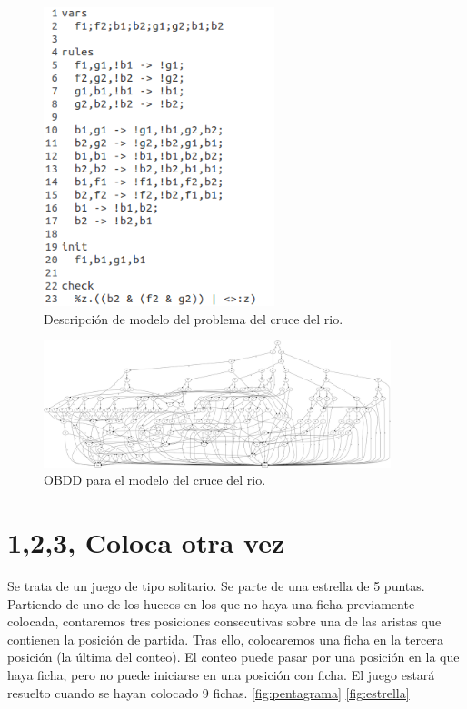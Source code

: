\begin{figure}[H]
  \centering
  \includegraphics[width=0.6\textwidth]{Figures/rivercross.png}
  \caption{Descripción de modelo del problema del cruce del rio.}
  \label{fig:river}
\end{figure}

\begin{figure}[H]
  \centering
  \includegraphics[width=0.9\textwidth]{Figures/riverobdd.png}
  \caption{OBDD para el modelo del cruce del rio.}
  \label{fig:riverobdd}
\end{figure}

\section{1,2,3, Coloca otra vez}

Se trata de un juego de tipo solitario.
Se parte de una estrella de 5 puntas.
Partiendo de uno de los huecos en los que no haya una ficha previamente colocada, contaremos tres posiciones consecutivas sobre una de las aristas que contienen la posición de partida. Tras ello, colocaremos una ficha en la tercera posición (la última del conteo).
El conteo puede pasar por una posición en la que haya ficha, pero no puede iniciarse en una posición con ficha.
El juego estará resuelto cuando se hayan colocado 9 fichas. \cite{Juegos:11} \ref{fig:pentagrama} \ref{fig:estrella}

